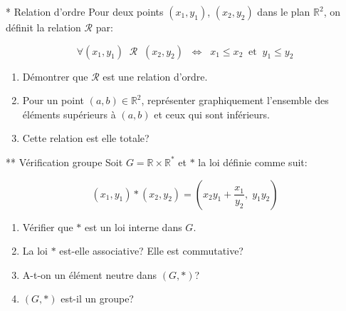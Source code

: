 \documentclass[exam]{cs188}
\begin{document}
\newpage
\begin{problem}[2]{* Relation d'ordre}
  Pour deux points $(x_1, y_1)$, $(x_2, y_2)$ dans le plan $\mathbb{R}^2$, on
  définit la relation $\mathcal{R}$ par:

  \begin{equation}
    \label{eq:order}
    \forall (x_1,y_1)\;\;\mathcal{R}\;\;(x_2,y_2)\;\;\iff\;\;x_1\leq
    x_2\;\;\text{et}\;\; y_1\leq y_2
  \end{equation}
  \begin{enumerate}
    \item Démontrer que $\mathcal{R}$ est une relation d'ordre.
    \item Pour un point $(a,b)\in \mathbb{R}^2$, représenter graphiquement l'ensemble des
      éléments supérieurs à $(a,b)$ et ceux  qui sont inférieurs.
    \item Cette relation est elle totale?
  \end{enumerate}
\end{problem}
\begin{problem}[2]{** Vérification groupe}
  Soit $G = \mathbb{R}\times\mathbb{R}^{*}$ et $*$ la loi définie comme suit:

  \begin{equation}
    \label{eq:loi_interne}
    (x_1, y_1)*(x_2,y_2)= \left( x_2 y_1 + \dfrac{x_1}{y_2},\;y_1y_2\right)
  \end{equation}

  \begin{enumerate}
    \item Vérifier que $*$ est un loi interne dans $G$.
    \item La loi $*$ est-elle associative? Elle est commutative?
    \item A-t-on un élément neutre dans $\left(G,*\right)$?
    \item $\left(G, *\right)$ est-il un groupe?
  \end{enumerate}
\end{problem}
\end{document}

